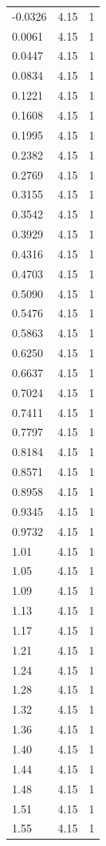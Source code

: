 \begin{longtable}{lrr}
  -0.0326 & 4.15 & 1 \\
  0.0061 & 4.15 & 1 \\
  0.0447 & 4.15 & 1 \\
  0.0834 & 4.15 & 1 \\
  0.1221 & 4.15 & 1 \\
  0.1608 & 4.15 & 1 \\
  0.1995 & 4.15 & 1 \\
  0.2382 & 4.15 & 1 \\
  0.2769 & 4.15 & 1 \\
  0.3155 & 4.15 & 1 \\
  0.3542 & 4.15 & 1 \\
  0.3929 & 4.15 & 1 \\
  0.4316 & 4.15 & 1 \\
  0.4703 & 4.15 & 1 \\
  0.5090 & 4.15 & 1 \\
  0.5476 & 4.15 & 1 \\
  0.5863 & 4.15 & 1 \\
  0.6250 & 4.15 & 1 \\
  0.6637 & 4.15 & 1 \\
  0.7024 & 4.15 & 1 \\
  0.7411 & 4.15 & 1 \\
  0.7797 & 4.15 & 1 \\
  0.8184 & 4.15 & 1 \\
  0.8571 & 4.15 & 1 \\
  0.8958 & 4.15 & 1 \\
  0.9345 & 4.15 & 1 \\
  0.9732 & 4.15 & 1 \\
  1.01 & 4.15 & 1 \\
  1.05 & 4.15 & 1 \\
  1.09 & 4.15 & 1 \\
  1.13 & 4.15 & 1 \\
  1.17 & 4.15 & 1 \\
  1.21 & 4.15 & 1 \\
  1.24 & 4.15 & 1 \\
  1.28 & 4.15 & 1 \\
  1.32 & 4.15 & 1 \\
  1.36 & 4.15 & 1 \\
  1.40 & 4.15 & 1 \\
  1.44 & 4.15 & 1 \\
  1.48 & 4.15 & 1 \\
  1.51 & 4.15 & 1 \\
  1.55 & 4.15 & 1 \\

\end{longtable}
